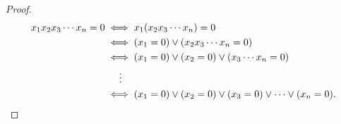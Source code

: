 \begin{proof}
\begin{align*}
x_1x_2x_3\cdots x_n=0&\iff x_1(x_2x_3\cdots x_n)=0\\
                     &\iff (x_1=0)\vee(x_2x_3\cdots x_n=0)\\
                     &\iff (x_1=0)\vee(x_2=0)\vee(x_3\cdots x_n=0)\\
                     &\hphantom{11^1}\vdots\\
                     &\iff (x_1=0)\vee(x_2=0)\vee(x_3=0)\vee\cdots
                           \vee(x_n=0).
\end{align*}

\end{proof}




\newpage

